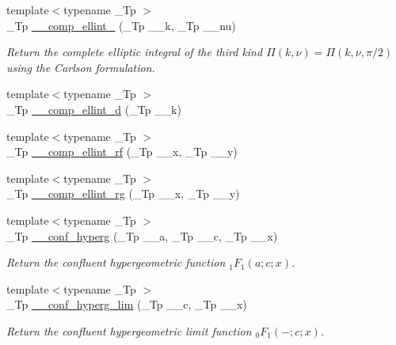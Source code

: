 \begin{DoxyCompactItemize}
{\footnotesize template$<$typename \+\_\+\+Tp $>$ }\\\+\_\+\+Tp \hyperlink{namespacestd_1_1____detail_a26b35b5d72366d30ac4644db8f2f8be4}{\+\_\+\+\_\+comp\+\_\+ellint\+\_} (\+\_\+\+Tp \+\_\+\+\_\+k, \+\_\+\+Tp \+\_\+\+\_\+nu)
\begin{DoxyCompactList}\small\item\em Return the complete elliptic integral of the third kind $ \Pi(k,\nu) = \Pi(k,\nu,\pi/2) $ using the Carlson formulation. \end{DoxyCompactList}\item 
{\footnotesize template$<$typename \+\_\+\+Tp $>$ }\\\+\_\+\+Tp \hyperlink{namespacestd_1_1____detail_add5220a1ab03915e4a45dc547bb8eef6}{\+\_\+\+\_\+comp\+\_\+ellint\+\_\+d} (\+\_\+\+Tp \+\_\+\+\_\+k)
\item 
{\footnotesize template$<$typename \+\_\+\+Tp $>$ }\\\+\_\+\+Tp \hyperlink{namespacestd_1_1____detail_a41ecec8820344d3575b464ecd4db5171}{\+\_\+\+\_\+comp\+\_\+ellint\+\_\+rf} (\+\_\+\+Tp \+\_\+\+\_\+x, \+\_\+\+Tp \+\_\+\+\_\+y)
\item 
{\footnotesize template$<$typename \+\_\+\+Tp $>$ }\\\+\_\+\+Tp \hyperlink{namespacestd_1_1____detail_a31bb5a6e359c88b5bece8dd73f76a2f9}{\+\_\+\+\_\+comp\+\_\+ellint\+\_\+rg} (\+\_\+\+Tp \+\_\+\+\_\+x, \+\_\+\+Tp \+\_\+\+\_\+y)
\item 
{\footnotesize template$<$typename \+\_\+\+Tp $>$ }\\\+\_\+\+Tp \hyperlink{namespacestd_1_1____detail_a3cb3151857e9ac01bc442c90301365ee}{\+\_\+\+\_\+conf\+\_\+hyperg} (\+\_\+\+Tp \+\_\+\+\_\+a, \+\_\+\+Tp \+\_\+\+\_\+c, \+\_\+\+Tp \+\_\+\+\_\+x)
\begin{DoxyCompactList}\small\item\em Return the confluent hypergeometric function $ _1F_1(a;c;x) $. \end{DoxyCompactList}\item 
{\footnotesize template$<$typename \+\_\+\+Tp $>$ }\\\+\_\+\+Tp \hyperlink{namespacestd_1_1____detail_adc839c2b3faad5d78bf64236c5c7af73}{\+\_\+\+\_\+conf\+\_\+hyperg\+\_\+lim} (\+\_\+\+Tp \+\_\+\+\_\+c, \+\_\+\+Tp \+\_\+\+\_\+x)
\begin{DoxyCompactList}\small\item\em Return the confluent hypergeometric limit function $ _0F_1(-;c;x) $. \end{DoxyCompactList}\item 

\end{DoxyCompactItemize}
